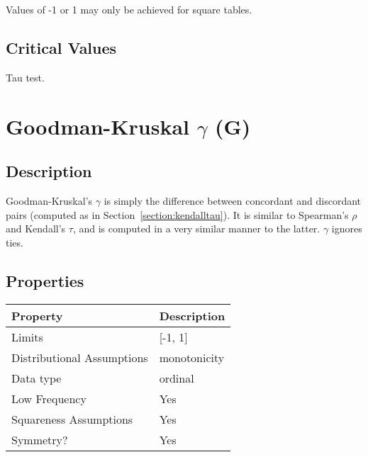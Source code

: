 \documentclass[11pt]{article}
\begin{document}
Values of -1 or 1 may only be achieved for square tables.


\subsection{Critical Values}
Tau test.








\section{Goodman-Kruskal $\gamma$ (G)} %
\subsection{Description}
Goodman-Kruskal's $\gamma$ is simply the difference between concordant and discordant pairs (computed as in Section~\ref{section:kendalltau}).  It is similar to Spearman's $\rho$ and Kendall's $\tau$, and is computed in a very similar manner to the latter.  $\gamma$ ignores ties.

\subsection{Properties}
\begin{tabular}{| l || l |}
    \hline
    {\bf Property} & {\bf Description} \\
    \hline
    Limits & [-1, 1] \\ \hline

    Distributional Assumptions& monotonicity \\ \hline

    Data type & ordinal \\ \hline

    Low Frequency & Yes \\ \hline

    Squareness Assumptions & Yes \\ \hline
    
    Symmetry? & Yes \\ \hline

\end{tabular}
\end{document}
